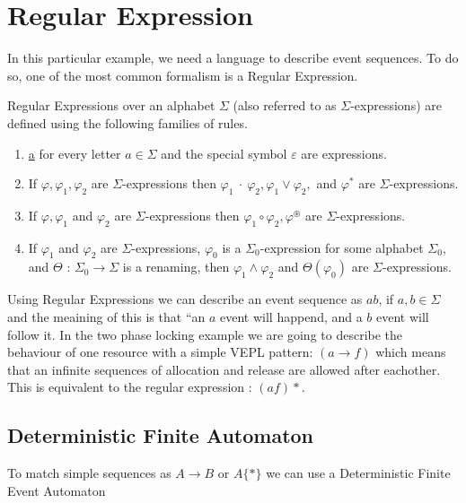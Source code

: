 		
	\section{Regular Expression}
		In this particular example, we need a language to describe event sequences. To do so, one of the most common
		formalism is a Regular Expression.
		
		\begin{dfn}
			\label{dfn:cep:tre}
			Regular Expressions over an alphabet $\Sigma$ (also referred to as $\Sigma$-expressions)
			are defined using the following families of rules.
			\begin{enumerate}
				\item \underline{a} for every letter $a \in \Sigma$ and the special symbol $\varepsilon$ are expressions.
				\item If $\varphi, \varphi_1, \varphi_2$ are $\Sigma$-expressions then
					$\varphi_1~\cdot~\varphi_2, \varphi_1 \vee \varphi_2,$ and $\varphi^\ast$ are $\Sigma$-expressions.
				\item If $\varphi, \varphi_1$ and $\varphi_2$ are $\Sigma$-expressions then $\varphi_1 \circ \varphi_2, \varphi^\circledast$ are
					$\Sigma$-expressions.
				\item If $\varphi_1$ and $\varphi_2$ are $\Sigma$-expressions, $\varphi_0$ is a $\Sigma_0$-expression
					for some alphabet $\Sigma_0$, and $\Theta$ : $\Sigma_0 \rightarrow \Sigma$ is
					a renaming, then $\varphi_1 \wedge \varphi_2$ and $\Theta(\varphi_0)$ are $\Sigma$-expressions.
			\end{enumerate}
		\end{dfn}
		
		Using Regular Expressions we can describe an event sequence as $ab$, if $a,b \in \Sigma$ and the meaining of this is that ``an $a$ event will happend,
		and a $b$ event will follow it. In the two phase locking example we are going to describe the behaviour of one resource with a simple VEPL pattern:
		$(a \rightarrow f)$ which means that an infinite sequences of allocation and release are allowed after eachother. This is equivalent to the regular expression :		
		$(af)*$.
		
		
		
		\subsection{Deterministic Finite Automaton}
			To match simple sequences as $A \rightarrow B$ or $A \{\ast\}$ we can use a Deterministic Finite Event Automaton


